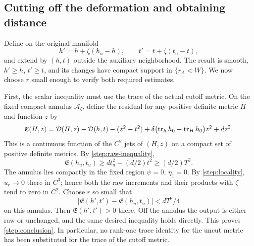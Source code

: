 \subsection{Cutting off the deformation and obtaining distance}

Define on the original manifold
\begin{equation}\label{step:final-output}
 h'=h+\zeta(h_u-h),\qquad t'=t+\zeta(t_u-t),
\end{equation}
and extend by $(h,t)$ outside the auxiliary neighborhood.  The result
is smooth, $h'\ge h$, $t'\ge t$, and its changes have compact support
in $\{r_A<W\}$.  We now choose $r$ small enough to verify both
required estimates.

First, the scalar inequality must use the trace of the actual cutoff
metric.  On the fixed compact annulus $\mathcal A_\zeta$, define the residual for any positive definite metric $H$
and function $z$ by
\[
 \mathfrak E(H,z)=\mathcal D(H,z)-\mathcal D(h,t)-(z^2-t^2)
 +\delta\bigl(\operatorname{tr}_hh_0-\operatorname{tr}_Hh_0\bigr)z^2+dz^2.
\]
This is a continuous function of the $C^2$ jets of $(H,z)$ on a compact
set of positive definite metrics.  By \cref{step:raw-inequality},
\[
 \mathfrak E(h_u,t_u)\ge dt_u^2-(d/2)t^2\ge(d/2)T^2.
\]
The annulus lies compactly in the fixed region $\psi=0$, $\eta_1=0$.
By \cref{step:locality}, $u_r\to0$ there in $C^3$; hence both the raw
increments and their products with $\zeta$ tend to zero in $C^2$.
Choose $r$ so small that
\[
 |\mathfrak E(h',t')-\mathfrak E(h_u,t_u)|<dT^2/4
\]
on this annulus.  Then $\mathfrak E(h',t')>0$ there.  Off the annulus
the output is either raw or unchanged, and the same desired inequality
holds directly.  This proves \cref{step:conclusion}.  In particular,
no rank-one trace identity for the uncut metric has been substituted
for the trace of the cutoff metric.

